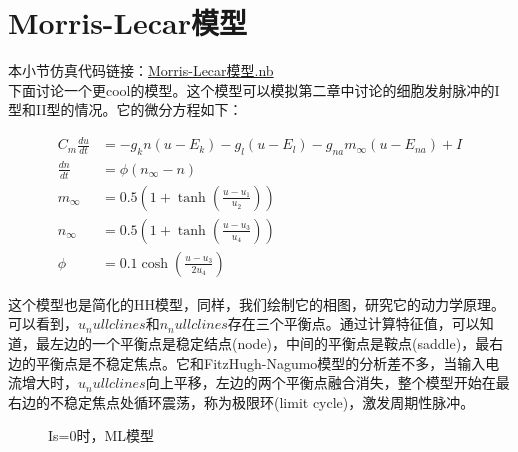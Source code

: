 \documentclass[12pt, a4paper, oneside]{ctexbook}
\begin{document}

\section{Morris-Lecar模型}
\textcolor[rgb]{1,0,0}{本小节仿真代码链接：\href{./降维到二维/Morris-Lecar模型.nb}{Morris-Lecar模型.nb}}\\
下面讨论一个更cool的模型。这个模型可以模拟第二章中讨论的细胞发射脉冲的I型和II型的情况。它的微分方程如下：

\begin{equation}
    \begin{aligned}
        C_m\frac{du}{dt}&=-g_k n (u-E_k)-g_l (u-E_l)-g_{na} m_\infty (u-E_{na})+I\\
        \frac{dn}{dt}&=\phi  (n_\infty-n)\\
        m_\infty&=0.5 (1+\tanh(\frac{u-u_1}{u_2}))\\
        n_\infty&=0.5 (1+\tanh(\frac{u-u_3}{u_4}))\\
        \phi &=0.1 \cosh (\frac{u-u_3}{2 u_4})
    \end{aligned}
\end{equation}

这个模型也是简化的HH模型，同样，我们绘制它的相图，研究它的动力学原理。可以看到，$u_nullclines$和$n_nullclines$存在三个平衡点。通过计算特征值，可以知道，最左边的一个平衡点是稳定结点(node)，中间的平衡点是鞍点(saddle)，最右边的平衡点是不稳定焦点。它和FitzHugh-Nagumo模型的分析差不多，当输入电流增大时，$u_nullclines$向上平移，左边的两个平衡点融合消失，整个模型开始在最右边的不稳定焦点处循环震荡，称为极限环(limit cycle)，激发周期性脉冲。

\begin{figure}[H]
    \centering
    \caption{Is=0时，ML模型}
\end{figure}
\end{document}
